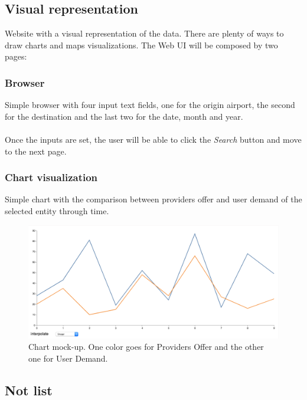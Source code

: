 \subsection{Visual representation} \label{visual_representation}

Website with a visual representation of the data. There are plenty of ways to draw charts and maps visualizations. The Web UI will be composed by two pages:

\subsubsection{Browser} \label{browser}

Simple browser with four input text fields, one for the origin airport, the second for the destination and the last two for the date, month and year.
\\\\
Once the inputs are set, the user will be able to click the \textit{Search} button and move to the next page.

\subsubsection{Chart visualization} \label{chart_visualization}

Simple chart with the comparison between providers offer and user demand of the selected entity through time.

\begin{figure}[H]
\centering
\includegraphics[scale=0.4]{resources/lineal-chart-example01.png}
\caption{Chart mock-up. One color goes for Providers Offer and the other one for User Demand.}
\end{figure}

\subsection{Not list} \label{not_list}

